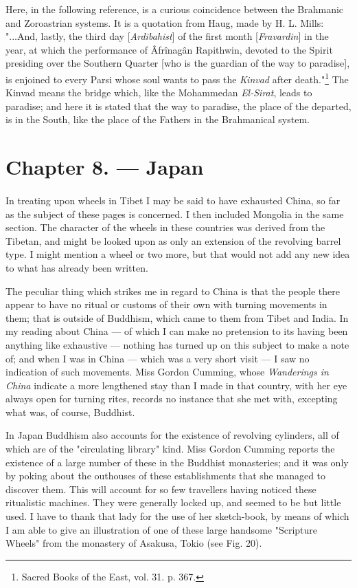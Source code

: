 \documentclass[a4paper, 11pt, oneside, polutonikogreek, english]{article}
\begin{document}
Here, in the following reference, is a curious coincidence between the Brahmanic and Zoroastrian systems. It is a quotation from Haug, made by H. L. Mills: "...And, lastly, the third day [\emph{Ardibahist}] of the first month [\emph{Fravardin}] in the year, at which the performance of Âfrînagân Rapithwin, devoted to the Spirit presiding over the Southern Quarter [who is the guardian of the way to paradise], is enjoined to every Parsi whose soul wants to pass the \emph{Kinvad} after death."\footnote{Sacred Books of the East, vol. 31. p. 367.} The Kinvad means the bridge which, like the Mohammedan \emph{El-Sirat}, leads to paradise; and here it is stated that the way to paradise, the place of the departed, is in the South, like the place of the Fathers in the Brahmanical system.
\clearpage
\section{Chapter 8. --- Japan}
\paragraph{}
In treating upon wheels in Tibet I may be said to have exhausted China, so far as the subject of these pages is concerned. I then included Mongolia in the same section. The character of the wheels in these countries was derived from the Tibetan, and might be looked upon as only an extension of the revolving barrel type. I might mention a wheel or two more, but that would not add any new idea to what has already been written.

The peculiar thing which strikes me in regard to China is that the people there appear to have no ritual or customs of their own with turning movements in them; that is outside of Buddhism, which came to them from Tibet and India. In my reading about China --- of which I can make no pretension to its having been anything like exhaustive --- nothing has turned up on this subject to make a note of; and when I was in China --- which was a very short visit --- I saw no indication of such movements. Miss Gordon Cumming, whose \emph{Wanderings in China} indicate a more lengthened stay than I made in that country, with her eye always open for turning rites, records no instance that she met with, excepting what was, of course, Buddhist.

In Japan Buddhism also accounts for the existence of revolving cylinders, all of which are of the "circulating library" kind. Miss Gordon Cumming reports the existence of a large number of these in the Buddhist monasteries; and it was only by poking about the outhouses of these establishments that she managed to discover them. This will account for so few travellers having noticed these ritualistic machines. They were generally locked up, and seemed to be but little used. I have to thank that lady for the use of her sketch-book, by means of which I am able to give an illustration of one of these large handsome "Scripture Wheels" from the monastery of Asakusa, Tokio (see Fig. 20).
\end{document}
